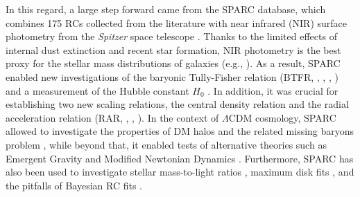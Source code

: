 \documentclass{iau}
\begin{document}
In this regard, a large step forward came from the SPARC database, which combines 175 RCs collected from the literature with near infrared (NIR) surface photometry from the \textit{Spitzer} space telescope \citep{Lelli2016}. Thanks to the limited effects of internal dust extinction and recent star formation, NIR photometry is the best proxy for the stellar mass distributions of galaxies (e.g., \citeauthor{Verheijen2001a} \citeyear{Verheijen2001a}). As a result, SPARC enabled new investigations of the baryonic Tully-Fisher relation (BTFR, \citeauthor{Lelli2016BTFR} \citeyear{Lelli2016BTFR}, \citeyear{Lelli2019BTFR}, \citeauthor{Desmond2019BTFR} \citeyear{Desmond2019BTFR}, \citeauthor{McGaugh2021BTFR} \citeyear{McGaugh2021BTFR}) and a measurement of the Hubble constant $H_0$ \citep{Schombert2020H0}. In addition, it was crucial for establishing two new scaling relations, the central density relation \citep{Lelli2016CDR} and the radial acceleration relation (RAR, \citeauthor{McGaugh2016RAR} \citeyear{McGaugh2016RAR}, \citeauthor{Lelli2017RAR} \citeyear{Lelli2017RAR}, \citeauthor{Li2018RAR} \citeyear{Li2018RAR}). In the context of $\Lambda$CDM cosmology, SPARC allowed to investigate the properties of DM halos \citep{Katz2017Halos, Katz2019Halos, Li2019aHalos, Li2019bHalos, Li2020Halos, Li2022aHalos, Li2022bHalos} and the related missing baryons problem \citep{Katz2018MissBar}, while beyond that, it enabled tests of alternative theories such as Emergent Gravity \citep{Lelli2017EG} and Modified Newtonian Dynamics \citep{Petersen2020, Chae2020EFE, Chae2021EFE, Chae2022EFE}. Furthermore, SPARC has also been used to investigate stellar mass-to-light ratios \citep{Schombert2019ML, Schombert2022ML}, maximum disk fits \citep{Starkman2018Fits}, and the pitfalls of Bayesian RC fits \citep{Li2021Fits}.
\end{document}
